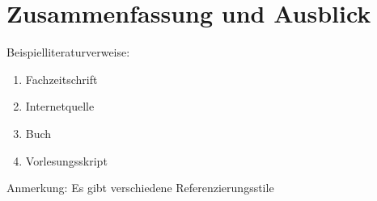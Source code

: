 \chapter{Zusammenfassung und Ausblick}
\label{chap:Ausblick}
\pagestyle{OnlySection}		%

Beispielliteraturverweise: 

\begin{enumerate}
	\item Fachzeitschrift
	\item Internetquelle
	\item Buch 
	\item Vorlesungsskript
\end{enumerate}

Anmerkung: Es gibt verschiedene Referenzierungsstile 
